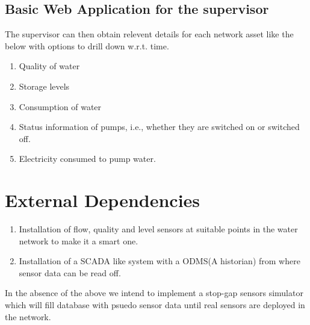 \documentclass[paper=a4, fontsize=11pt]{scrartcl} %
\numberwithin{equation}{section} %
\numberwithin{figure}{section} %
\numberwithin{table}{section} %
\begin{document}
\subsection{Basic Web Application for the supervisor}
The supervisor can then obtain relevent details for each network asset like the below with options to drill down w.r.t. time.
\begin{enumerate}
\item
Quality of water
\item
Storage levels
\item
Consumption of water
\item
Status information of pumps, i.e., whether they are switched on or switched off.
\item
Electricity consumed to pump water.
\end{enumerate}

\section{External Dependencies}
\begin{enumerate}
\item
Installation of flow, quality and level sensors at suitable points in the water network to make it a smart one. 
\item
Installation of a SCADA like system with a ODMS(A historian) from where sensor data can be read off.
\end{enumerate}
In the absence of the above we intend to implement a stop-gap sensors simulator which will fill database with psuedo sensor data until real sensors are deployed in the network.
\end{document}
